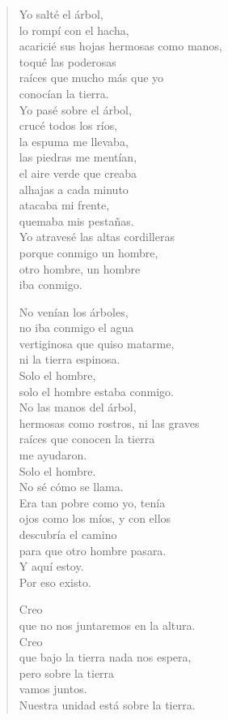 \documentclass[12pt]{article}
\begin{document}
\begin{verse}
Yo salté el árbol,\\
lo rompí con el hacha,\\
acaricié sus hojas hermosas como manos,\\
toqué las poderosas\\
raíces que mucho más que yo\\
conocían la tierra.\\
Yo pasé sobre el árbol,\\
crucé todos los ríos,\\
la espuma me llevaba,\\
las piedras me mentían,\\
el aire verde que creaba\\
alhajas a cada minuto\\
atacaba mi frente,\\
quemaba mis pestañas.\\
Yo atravesé las altas cordilleras\\
porque conmigo un hombre,\\
otro hombre, un hombre\\
iba conmigo.  

No venían los árboles,\\
no iba conmigo el agua\\
vertiginosa que quiso matarme,\\
ni la tierra espinosa.\\
Solo el hombre,\\
solo el hombre estaba conmigo.\\
No las manos del árbol,\\
hermosas como rostros, ni las graves\\
raíces que conocen la tierra\\
me ayudaron.\\
Solo el hombre.\\
No sé cómo se llama.\\
Era tan pobre como yo, tenía\\
ojos como los míos, y con ellos\\
descubría el camino\\
para que otro hombre pasara.\\
Y aquí estoy.\\
Por eso existo.  

Creo\\
que no nos juntaremos en la altura.\\
Creo\\
que bajo la tierra nada nos espera,\\
pero sobre la tierra\\
vamos juntos.\\
Nuestra unidad está sobre la tierra.  

\end{verse}
\end{document}
